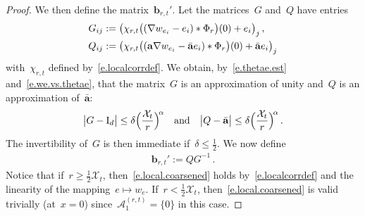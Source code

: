 \documentclass[11pt,twoside]{article} %
\numberwithin{equation}{section}
\theoremstyle{definition}
\newcommand*{\Id}{\ensuremath{\mathrm{I}_d}}
\renewcommand{\b}{\ensuremath{\mathbf{b}}}
\newcommand{\qand}{\quad \mbox{and} \quad }
\renewcommand{\a}{\mathbf{a}}
\newcommand{\ahom}{\bar{\a}}
\newcommand{\X}{\mathcal{X}}
\newcommand{\minscale}{\chi}
\begin{document}
\begin{proof}
\smallskip

We then define the matrix~$\b_{r,t}'$. Let the matrices~$G$ and~$Q$ have entries 
\begin{align} \label{e.JandQ}
\notag
G_{ij} & := \bigl(  \minscale_{r,t}  \bigl((\nabla w_{e_i} - e_i) \ast \Phi_{r}\bigr)(0)+ e_i \bigl)_j \,, 
\\ 
Q_{ij} & := \bigl(  \minscale_{r,t}  \bigl((\a \nabla w_{e_i} - \ahom e_i) \ast \Phi_{r}\bigr)(0)+ \ahom e_i \bigl)_j
\end{align}
with~$\minscale_{r,t}$ defined by~\eqref{e.localcorrdef}. We obtain, by~\eqref{e.thetae.est} and~\eqref{e.we.vs.thetae}, that the matrix~$G$ is an approximation of unity and~$Q$ is an approximation of~$\ahom$:
\begin{align*}  
\big| G - \Id \big| \leq \delta  \Bigl( \frac{\X_t}{r} \Bigr)^{\! \alpha} 
\qand 
\big| Q - \ahom \big| \leq \delta  \Bigl( \frac{\X_t}{r} \Bigr)^{\! \alpha} \,.
\end{align*}
The invertibility of~$G$ is then immediate if~$\delta \leq \frac12$. We now define 
\begin{align*}  
\b_{r,t}' := Q G^{-1}  \,.
\end{align*}
Notice that if~$r \geq \frac12 \X_t$, then~\eqref{e.local.coarsened} holds by~\eqref{e.localcorrdef} and the linearity of the mapping~$e\mapsto w_e$. If~$r < \frac12 \X_t$, then~\eqref{e.local.coarsened} is valid trivially (at~$x = 0$) since~$\mathcal{A}_1^{(r,t)} = \{0\}$ in this case. 

\smallskip


\end{proof}
\end{document}
